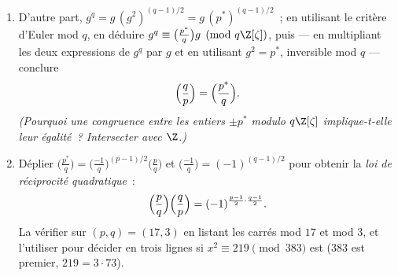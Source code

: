 \begin{problem}
\begin{enumerate}[resume]
        \emph{(rêve du collégien~: $(x + y)^q \equiv x^q +
        y^q$ mod $q$ dans tout anneau commutatif~; alors $g^q
        \equiv \sum_a\bigl(\frac ap\bigr)^q\zeta^{aq}$,
        réindexer $b = aq$ et extraire
        $\bigl(\frac{q^{-1}}p\bigr) = \bigl(\frac qp\bigr)$)}.
  \item D'autre part, $g^q = g\,(g^2)^{(q-1)/2} =
        g\,(p^*)^{(q-1)/2}$~; en utilisant le critère d'Euler
        mod $q$, en déduire $g^q \equiv \bigl(\frac{p^*}q\bigr)g
        \pmod{q\Z[\zeta]}$, puis --- en multipliant les deux
        expressions de $g^q$ par $g$ et en utilisant $g^2 =
        p^*$, inversible mod $q$ --- conclure
        \[
        \Bigl(\frac qp\Bigr) = \Bigl(\frac{p^*}q\Bigr) .
        \]
        \emph{(Pourquoi une congruence entre les entiers $\pm
        p^*$ modulo $q\Z[\zeta]$ implique-t-elle leur
        égalité~? Intersecter avec $\Z$.)}
  \item Déplier $\bigl(\frac{p^*}q\bigr) =
        \bigl(\frac{-1}q\bigr)^{(p-1)/2}\bigl(\frac pq\bigr)$
        et $\bigl(\frac{-1}q\bigr) = (-1)^{(q-1)/2}$ pour
        obtenir la \emph{loi de réciprocité quadratique}~:
        \[
        \Bigl(\frac pq\Bigr)\Bigl(\frac qp\Bigr)
        = (-1)^{\frac{p-1}2\cdot\frac{q-1}2} .
        \]
        La vérifier sur $(p, q) = (17, 3)$ en listant les
        carrés mod $17$ et mod $3$, et l'utiliser pour
        décider en trois lignes si $x^2 \equiv 219 \pmod{383}$
        est  ($383$ est premier, $219 = 3\cdot73$).
\end{enumerate}


\end{problem}
